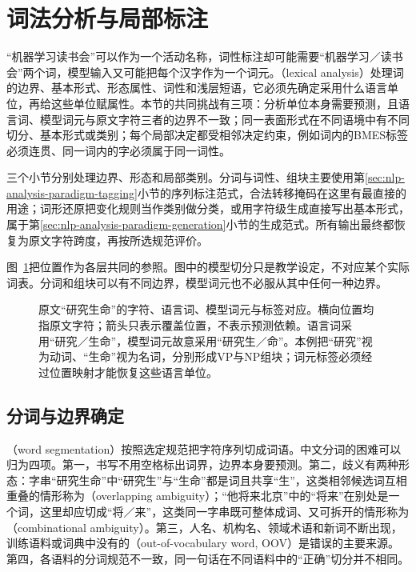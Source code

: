 \section{词法分析与局部标注}
\label{sec:nlp-analysis-lexical}

“机器学习读书会”可以作为一个活动名称，词性标注却可能需要“机器学习／读书会”两个词，模型输入又可能把每个汉字作为一个词元。（lexical analysis）处理词的边界、基本形式、形态属性、词性和浅层短语，它必须先确定采用什么语言单位，再给这些单位赋属性。本节的共同挑战有三项：分析单位本身需要预测，且语言词、模型词元与原文字符三者的边界不一致；同一表面形式在不同语境中有不同切分、基本形式或类别；每个局部决定都受相邻决定约束，例如词内的BMES标签必须连贯、同一词内的字必须属于同一词性。

三个小节分别处理边界、形态和局部类别。分词与词性、组块主要使用第\ref{sec:nlp-analysis-paradigm-tagging}小节的序列标注范式，合法转移掩码在这里有最直接的用途；词形还原把变化规则当作类别做分类，或用字符级生成直接写出基本形式，属于第\ref{sec:nlp-analysis-paradigm-generation}小节的生成范式。所有输出最终都恢复为原文字符跨度，再按所选规范评价。

图~\ref{fig:nlp-analysis-alignment}把位置作为各层共同的参照。图中的模型切分只是教学设定，不对应某个实际词表。分词和组块可以有不同边界，模型词元也不必服从其中任何一种边界。

\begin{figure}[htbp]
  \centering
  
  \caption{原文“研究生命”的字符、语言词、模型词元与标签对应。横向位置均指原文字符；箭头只表示覆盖位置，不表示预测依赖。语言词采用“研究／生命”，模型词元故意采用“研究生／命”。本例把“研究”视为动词、“生命”视为名词，分别形成VP与NP组块；词元标签必须经过位置映射才能恢复这些语言单位。}
  \label{fig:nlp-analysis-alignment}
\end{figure}

\subsection{分词与边界确定}
\label{sec:nlp-analysis-segmentation}

（word segmentation）按照选定规范把字符序列切成词语。中文分词的困难可以归为四项。第一，书写不用空格标出词界，边界本身要预测。第二，歧义有两种形态：字串“研究生命”中“研究生”与“生命”都是词且共享“生”，这类相邻候选词互相重叠的情形称为（overlapping ambiguity）；“他将来北京”中的“将来”在别处是一个词，这里却应切成“将／来”，这类同一字串既可整体成词、又可拆开的情形称为（combinational ambiguity）。第三，人名、机构名、领域术语和新词不断出现，训练语料或词典中没有的（out-of-vocabulary word, OOV）是错误的主要来源。第四，各语料的分词规范不一致，同一句话在不同语料中的“正确”切分并不相同。

